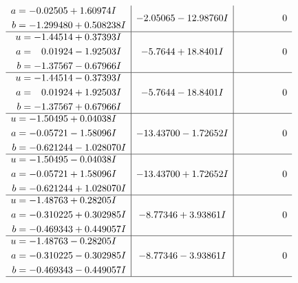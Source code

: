 \documentclass[1p]{elsarticle_modified}
\theoremstyle{definition}
\begin{document}
$$\begin{array}{c|c|c}
\begin{aligned}
a &= -0.02505 + 1.60974 I \\
b &= -1.299480 + 0.508238 I\end{aligned}
 & -2.05065 - 12.98760 I & \phantom{-0.000000 } 0 \\ \hline\begin{aligned}
u &= -1.44514 + 0.37393 I \\
a &= \phantom{-}0.01924 - 1.92503 I \\
b &= -1.37567 - 0.67966 I\end{aligned}
 & -5.7644 + 18.8401 I & \phantom{-0.000000 } 0 \\ \hline\begin{aligned}
u &= -1.44514 - 0.37393 I \\
a &= \phantom{-}0.01924 + 1.92503 I \\
b &= -1.37567 + 0.67966 I\end{aligned}
 & -5.7644 - 18.8401 I & \phantom{-0.000000 } 0 \\ \hline\begin{aligned}
u &= -1.50495 + 0.04038 I \\
a &= -0.05721 - 1.58096 I \\
b &= -0.621244 - 1.028070 I\end{aligned}
 & -13.43700 - 1.72652 I & \phantom{-0.000000 } 0 \\ \hline\begin{aligned}
u &= -1.50495 - 0.04038 I \\
a &= -0.05721 + 1.58096 I \\
b &= -0.621244 + 1.028070 I\end{aligned}
 & -13.43700 + 1.72652 I & \phantom{-0.000000 } 0 \\ \hline\begin{aligned}
u &= -1.48763 + 0.28205 I \\
a &= -0.310225 + 0.302985 I \\
b &= -0.469343 + 0.449057 I\end{aligned}
 & -8.77346 + 3.93861 I & \phantom{-0.000000 } 0 \\ \hline\begin{aligned}
u &= -1.48763 - 0.28205 I \\
a &= -0.310225 - 0.302985 I \\
b &= -0.469343 - 0.449057 I\end{aligned}
 & -8.77346 - 3.93861 I & \phantom{-0.000000 } 0\\
 \hline 
 \end{array}$$\newpage$$\begin{array}{c|c|c}  

\end{array}$$
\end{document}
